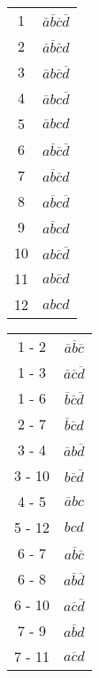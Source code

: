 \documentclass[a4paper,12pt]{article}
\begin{document}
\begin{table}[h!]
\centering
\begin{tabular}[t]{| c | c |}
\hline
\rowcolor{lightgray}1 & $\overline{a}\overline{b}\overline{c}\overline{d}$ \\
\rowcolor{lightgray}2 & $\overline{a}\overline{b}\overline{c}d$ \\
\rowcolor{lightgray}3 & $\overline{a}b\overline{c}\overline{d}$ \\
\rowcolor{lightgray}4 & $\overline{a}bc\overline{d}$ \\
\rowcolor{lightgray}5 & $\overline{a}bcd$ \\
\rowcolor{lightgray}6 & $a\overline{b}\overline{c}\overline{d}$ \\
\rowcolor{lightgray}7 & $a\overline{b}\overline{c}d$ \\
\rowcolor{lightgray}8 & $a\overline{b}c\overline{d}$ \\
\rowcolor{lightgray}9 & $a\overline{b}cd$ \\
\rowcolor{lightgray}10 & $ab\overline{c}\overline{d}$ \\
\rowcolor{lightgray}11 & $ab\overline{c}d$ \\
\rowcolor{lightgray}12 & $abcd$ \\
\hline
\end{tabular}
\quad
\begin{tabular}[t]{| c | c |}
\hline
\rowcolor{lightgray}1 - 2 & $\overline{a}\overline{b}\overline{c}$ \\
\rowcolor{lightgray}1 - 3 & $\overline{a}\overline{c}\overline{d}$ \\
\rowcolor{lightgray}1 - 6 & $\overline{b}\overline{c}\overline{d}$ \\
\rowcolor{lightgray}2 - 7 & $\overline{b}\overline{c}d$ \\
3 - 4 & $\overline{a}b\overline{d}$ \\
\rowcolor{lightgray}3 - 10 & $b\overline{c}\overline{d}$ \\
4 - 5 & $\overline{a}bc$ \\
5 - 12 & $bcd$ \\
\rowcolor{lightgray}6 - 7 & $a\overline{b}\overline{c}$ \\
\rowcolor{lightgray}6 - 8 & $a\overline{b}\overline{d}$ \\
\rowcolor{lightgray}6 - 10 & $a\overline{c}\overline{d}$ \\
\rowcolor{lightgray}7 - 9 & $a\overline{b}d$ \\
\rowcolor{lightgray}7 - 11 & $a\overline{c}d$ \\

\end{tabular}
\end{table}
\end{document}
